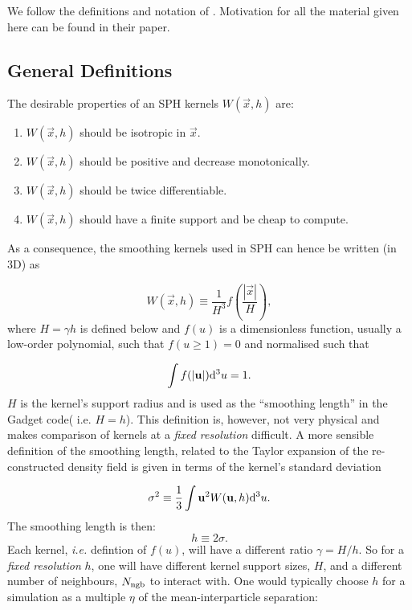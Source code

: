 We follow the definitions and notation of
\cite{Dehnen2012}. Motivation for all the material given here can be
found in their paper.

\subsection{General Definitions}

The desirable properties of an SPH kernels $W(\vec{x},h)$ are:
\begin{enumerate}
\item $W(\vec{x},h)$ should be isotropic in $\vec{x}$.
\item $W(\vec{x},h)$ should be positive and decrease monotonically.
\item $W(\vec{x},h)$ should be twice differentiable.
\item $W(\vec{x},h)$ should have a finite support and be cheap to
  compute.
\end{enumerate}
As a consequence, the smoothing kernels used in SPH can
hence be written (in 3D) as

\begin{equation}
 W(\vec{x},h) \equiv \frac{1}{H^3}f\left(\frac{|\vec{x}|}{H}\right),
\end{equation}
where $H=\gamma h$ is defined below and $f(u)$ is a dimensionless
function, usually a low-order polynomial, such that $f(u \geq 1) = 0$
and normalised such that

\begin{equation}
  \int f(|\vec{u}|){\rm d}^3u = 1.
\end{equation}
$H$ is the kernel's support radius and is used as the ``smoothing
length'' in the Gadget code( {i.e.} $H=h$). This definition is,
however, not very physical and makes comparison of kernels at a
\emph{fixed resolution} difficult. A more sensible definition of the
smoothing length, related to the Taylor expansion of the
re-constructed density field is given in terms of the kernel's
standard deviation

\begin{equation}
  \sigma^2 \equiv \frac{1}{3}\int \vec{u}^2 W(\vec{u},h) {\rm d}^3u.
  \label{eq:sph:sigma}
\end{equation}
The smoothing length is then:
\begin{equation}
  h\equiv2\sigma.
    \label{eq:sph:h}
\end{equation}
Each kernel, {\it i.e.} defintion of $f(u)$, will have a different
ratio $\gamma = H/h$. So for a \emph{fixed resolution} $h$, one will
have different kernel support sizes, $H$, and a different number of
neighbours, $N_{\rm ngb}$ to interact with. One would typically choose
$h$ for a simulation as a multiple $\eta$ of the mean-interparticle
separation:

